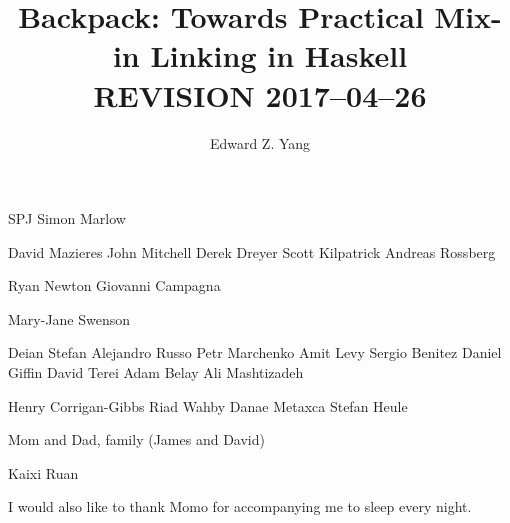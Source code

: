 \documentclass{report}
\begin{document}
\title{Backpack: Towards Practical Mix-in Linking in Haskell \\ REVISION 2017--04--26}
\author{Edward Z. Yang}

\beforepreface%
    SPJ
    Simon Marlow

    David Mazieres
    John Mitchell
    Derek Dreyer
    Scott Kilpatrick
    Andreas Rossberg

    Ryan Newton
    Giovanni Campagna

    Mary-Jane Swenson

    Deian Stefan
    Alejandro Russo
    Petr Marchenko
    Amit Levy
    Sergio Benitez
    Daniel Giffin
    David Terei
    Adam Belay
    Ali Mashtizadeh

    Henry Corrigan-Gibbs
    Riad Wahby
    Danae Metaxca
    Stefan Heule

    Mom and Dad, family (James and David)

    Kaixi Ruan

    I would also like to thank Momo for accompanying me to sleep every
    night.
\afterpreface%
















\end{document}
